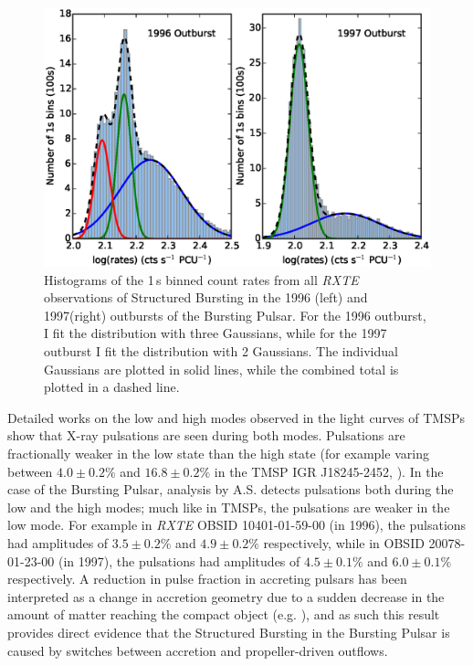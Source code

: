 \begin{figure}
 \centering
 \includegraphics[width=.82\linewidth, trim={1.3cm 0.1cm 1.7cm 1.1cm},clip]{images/hist_bo.eps}
 \caption[Histograms of the 1\,s binned count rates from all \textit{RXTE} observations of Structured Bursting in the 1996 and 1997 outbursts of the Bursting Pulsar.]{Histograms of the 1\,s binned count rates from all \textit{RXTE} observations of Structured Bursting in the 1996 (left) and 1997(right) outbursts of the Bursting Pulsar. For the 1996 outburst, I fit the distribution with three Gaussians, while for the 1997 outburst I fit the distribution with 2 Gaussians. The individual Gaussians are plotted in solid lines, while the combined total is plotted in a dashed line.}
 \label{fig:bimodal}
\end{figure}

\par Detailed works on the low and high modes observed in the light curves of TMSPs show that X-ray pulsations are seen during both modes. Pulsations are fractionally weaker in the low state than the high state (for example varing between $4.0\pm0.2\%$ and $16.8\pm0.2\%$ in the TMSP IGR J18245-2452, \citealp{Ferrigno_TMSPVar}). In the case of the Bursting Pulsar, analysis by \textsf{A.S.} detects pulsations both during the low and the high modes; much like in TMSPs, the pulsations are weaker in the low mode. For example in \textit{RXTE} OBSID 10401-01-59-00 (in 1996), the pulsations had amplitudes of $3.5\pm0.2\%$ and $4.9\pm0.2\%$ respectively, while in OBSID 20078-01-23-00 (in 1997), the pulsations had amplitudes of $4.5\pm0.1\%$ and $6.0\pm0.1\%$ respectively. A reduction in pulse fraction in accreting pulsars has been interpreted as a change in accretion geometry due to a sudden decrease in the amount of matter reaching the compact object (e.g. \citealp{Ibragimov_PulseFrac}), and as such this result provides direct evidence that the Structured Bursting in the Bursting Pulsar is caused by switches between accretion and propeller-driven outflows.

